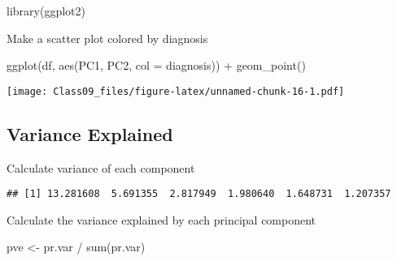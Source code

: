 \documentclass[
]{article}
\newenvironment{Shaded}{\begin{snugshade}}{\end{snugshade}}
\newcommand{\AttributeTok}[1]{\textcolor[rgb]{0.77,0.63,0.00}{#1}}
\newcommand{\DecValTok}[1]{\textcolor[rgb]{0.00,0.00,0.81}{#1}}
\newcommand{\FunctionTok}[1]{\textcolor[rgb]{0.00,0.00,0.00}{#1}}
\newcommand{\NormalTok}[1]{#1}
\newcommand{\OtherTok}[1]{\textcolor[rgb]{0.56,0.35,0.01}{#1}}
\newcommand{\SpecialCharTok}[1]{\textcolor[rgb]{0.00,0.00,0.00}{#1}}
\begin{document}
\begin{Shaded}
\end{Shaded}

\begin{Shaded}
\begin{Highlighting}[]
\FunctionTok{library}\NormalTok{(ggplot2)}
\end{Highlighting}
\end{Shaded}

Make a scatter plot colored by diagnosis

\begin{Shaded}
\begin{Highlighting}[]
\FunctionTok{ggplot}\NormalTok{(df, }\FunctionTok{aes}\NormalTok{(PC1, PC2, }\AttributeTok{col =}\NormalTok{ diagnosis)) }\SpecialCharTok{+}
  \FunctionTok{geom\_point}\NormalTok{()}
\end{Highlighting}
\end{Shaded}

\texttt{[image: Class09\_files/figure-latex/unnamed-chunk-16-1.pdf]}

\hypertarget{variance-explained}{%
\subsection{Variance Explained}\label{variance-explained}}

Calculate variance of each component

\begin{Shaded}
\end{Shaded}

\begin{verbatim}
## [1] 13.281608  5.691355  2.817949  1.980640  1.648731  1.207357
\end{verbatim}

Calculate the variance explained by each principal component

\begin{Shaded}
\begin{Highlighting}[]
\NormalTok{pve }\OtherTok{\textless{}{-}}\NormalTok{ pr.var }\SpecialCharTok{/} \FunctionTok{sum}\NormalTok{(pr.var)}
\end{Highlighting}
\end{Shaded}
\end{document}
